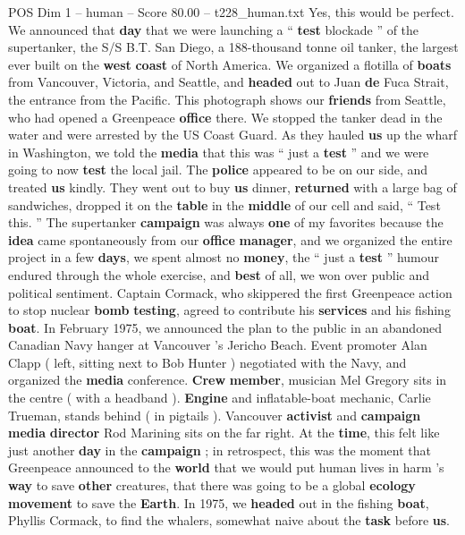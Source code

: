 \begin{textsample}{POS Dim 1 – human – Score 80.00 – t228\_human.txt}
Yes, this would be perfect.
We announced that \textbf{day} that we were launching a “ \textbf{test} blockade ” of the supertanker, the S/S B.T.
San Diego, a 188-thousand tonne oil tanker, the largest ever built on the \textbf{west} \textbf{coast} of North America.
We organized a flotilla of \textbf{boats} from Vancouver, Victoria, and Seattle, and \textbf{headed} out to Juan \textbf{de} Fuca Strait, the entrance from the Pacific.
This photograph shows our \textbf{friends} from Seattle, who had opened a Greenpeace \textbf{office} there.
We stopped the tanker dead in the water and were arrested by the US Coast Guard.
As they hauled \textbf{us} up the wharf in Washington, we told the \textbf{media} that this was “ just a \textbf{test} ” and we were going to now \textbf{test} the local jail.
The \textbf{police} appeared to be on our side, and treated \textbf{us} kindly.
They went out to buy \textbf{us} dinner, \textbf{returned} with a large bag of sandwiches, dropped it on the \textbf{table} in the \textbf{middle} of our cell and said, “ Test this. ” The supertanker \textbf{campaign} was always \textbf{one} of my favorites because the \textbf{idea} came spontaneously from our \textbf{office} \textbf{manager}, and we organized the entire project in a few \textbf{days}, we spent almost no \textbf{money}, the “ just a \textbf{test} ” humour endured through the whole exercise, and \textbf{best} of all, we won over public and political sentiment.
Captain Cormack, who skippered the first Greenpeace action to stop nuclear \textbf{bomb} \textbf{testing}, agreed to contribute his \textbf{services} and his fishing \textbf{boat}.
In February 1975, we announced the plan to the public in an abandoned Canadian Navy hanger at Vancouver ’s Jericho Beach.
Event promoter Alan Clapp ( left, sitting next to Bob Hunter ) negotiated with the Navy, and organized the \textbf{media} conference. \textbf{Crew} \textbf{member}, musician Mel Gregory sits in the centre ( with a headband ). \textbf{Engine} and inflatable-boat mechanic, Carlie Trueman, stands behind ( in pigtails ).
Vancouver \textbf{activist} and \textbf{campaign} \textbf{media} \textbf{director} Rod Marining sits on the far right.
At the \textbf{time}, this felt like just another \textbf{day} in the \textbf{campaign} ; in retrospect, this was the moment that Greenpeace announced to the \textbf{world} that we would put human lives in harm ’s \textbf{way} to save \textbf{other} creatures, that there was going to be a global \textbf{ecology} \textbf{movement} to save the \textbf{Earth}.
In 1975, we \textbf{headed} out in the fishing \textbf{boat}, Phyllis Cormack, to find the whalers, somewhat naive about the \textbf{task} before \textbf{us}.

\end{textsample}
